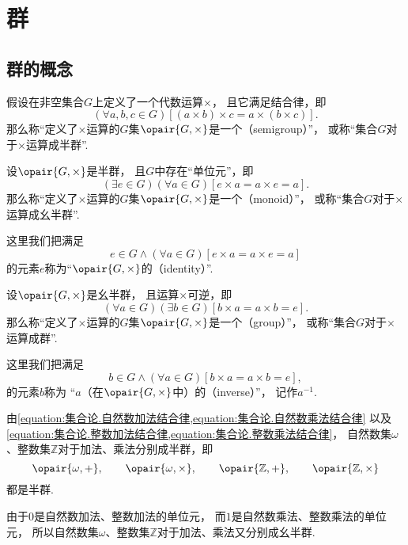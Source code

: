 \section{群}
\subsection{群的概念}
\begin{definition}
假设在非空集合\(G\)上定义了一个代数运算\(\times\)，
且它满足结合律，即\[
	(\forall a,b,c \in G)
	[(a \times b) \times c = a \times (b \times c)].
\]
那么称“定义了\(\times\)运算的\(G\)集\(\opair{G,\times}\)是一个（semigroup）”，
或称“集合\(G\)对于\(\times\)运算成半群”.
\end{definition}

\begin{definition}
设\(\opair{G,\times}\)是半群，
且\(G\)中存在“单位元”，即\[
	(\exists e \in G)(\forall a \in G)
	[e \times a = a \times e = a].
\]
那么称“定义了\(\times\)运算的\(G\)集\(\opair{G,\times}\)是一个（monoid）”，
或称“集合\(G\)对于\(\times\)运算成幺半群”.

这里我们把满足\[
	e \in G
	\land
    (\forall a \in G)
    [e \times a = a \times e = a]
\]的元素\(e\)称为“\(\opair{G,\times}\)的（identity）”.
\end{definition}

\begin{definition}
设\(\opair{G,\times}\)是幺半群，
且运算\(\times\)可逆，即\[
	(\forall a \in G)(\exists b \in G)
	[b \times a = a \times b = e].
\]
那么称“定义了\(\times\)运算的\(G\)集\(\opair{G,\times}\)是一个（group）”，
或称“集合\(G\)对于\(\times\)运算成群”.

这里我们把满足\[
	b \in G
	\land
	(\forall a \in G)
    [b \times a = a \times b = e],
\]的元素\(b\)称为%
“\(a\)（在\(\opair{G,\times}\)中）的（inverse）”，%
记作\(a^{-1}\).
\end{definition}

由\cref{equation:集合论.自然数加法结合律,equation:集合论.自然数乘法结合律}
以及\cref{equation:集合论.整数加法结合律,equation:集合论.整数乘法结合律}，
自然数集\(\omega\)、整数集\(\mathbb{Z}\)对于加法、乘法分别成半群，即\[
	\opair{\omega,+}, \qquad
	\opair{\omega,\times}, \qquad
	\opair{\mathbb{Z},+}, \qquad
	\opair{\mathbb{Z},\times}
\]都是半群.

由于\(0\)是自然数加法、整数加法的单位元，
而\(1\)是自然数乘法、整数乘法的单位元，
所以自然数集\(\omega\)、整数集\(\mathbb{Z}\)对于加法、乘法又分别成幺半群.

